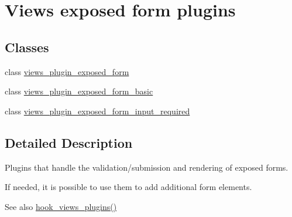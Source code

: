 \hypertarget{group__views__exposed__form__plugins}{
\section{Views exposed form plugins}
\label{group__views__exposed__form__plugins}
}
\subsection*{Classes}
\begin{DoxyCompactItemize}
\item 
class \hyperlink{classviews__plugin__exposed__form}{views\_\-plugin\_\-exposed\_\-form}
\item 
class \hyperlink{classviews__plugin__exposed__form__basic}{views\_\-plugin\_\-exposed\_\-form\_\-basic}
\item 
class \hyperlink{classviews__plugin__exposed__form__input__required}{views\_\-plugin\_\-exposed\_\-form\_\-input\_\-required}
\end{DoxyCompactItemize}


\subsection{Detailed Description}
Plugins that handle the validation/submission and rendering of exposed forms.

If needed, it is possible to use them to add additional form elements.

\begin{DoxySeeAlso}{See also}
\hyperlink{group__views__hooks_ga23f6e9972b2ed84fc54b7ff63f44477d}{hook\_\-views\_\-plugins()} 
\end{DoxySeeAlso}
